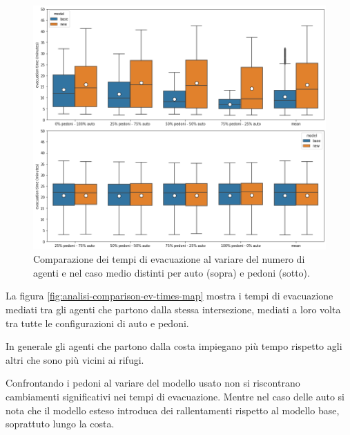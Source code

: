 \begin{figure}[h]
    \centering
    \includegraphics[width=\textwidth]{images/analisi/comparison-evtimes2.png}
    \caption{
        Comparazione dei tempi di evacuazione al variare del numero di agenti e nel caso medio distinti per auto (sopra) e pedoni (sotto).
    }
    \label{fig:analisi-comparison-evtimes2}
\end{figure}

\pagebreak

La figura \ref{fig:analisi-comparison-ev-times-map} mostra i tempi di evacuazione mediati tra gli agenti che partono dalla stessa intersezione,
mediati a loro volta tra tutte le configurazioni di auto e pedoni.

In generale gli agenti che partono dalla costa impiegano più tempo rispetto agli altri che sono più vicini ai rifugi.

Confrontando i pedoni al variare del modello usato non si riscontrano cambiamenti significativi nei tempi di evacuazione.
Mentre nel caso delle auto si nota che il modello esteso introduca dei rallentamenti rispetto al modello base, soprattuto lungo la costa.

